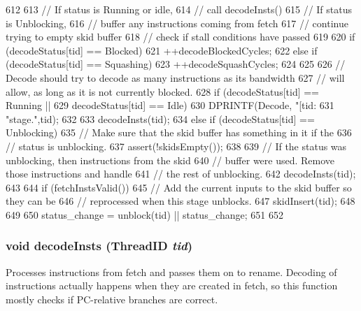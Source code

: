 \begin{DoxyCode}
612 {
613     // If status is Running or idle,
614     //     call decodeInsts()
615     // If status is Unblocking,
616     //     buffer any instructions coming from fetch
617     //     continue trying to empty skid buffer
618     //     check if stall conditions have passed
619 
620     if (decodeStatus[tid] == Blocked) {
621         ++decodeBlockedCycles;
622     } else if (decodeStatus[tid] == Squashing) {
623         ++decodeSquashCycles;
624     }
625 
626     // Decode should try to decode as many instructions as its bandwidth
627     // will allow, as long as it is not currently blocked.
628     if (decodeStatus[tid] == Running ||
629         decodeStatus[tid] == Idle) {
630         DPRINTF(Decode, "[tid:%
631                 "stage.\n",tid);
632 
633         decodeInsts(tid);
634     } else if (decodeStatus[tid] == Unblocking) {
635         // Make sure that the skid buffer has something in it if the
636         // status is unblocking.
637         assert(!skidsEmpty());
638 
639         // If the status was unblocking, then instructions from the skid
640         // buffer were used.  Remove those instructions and handle
641         // the rest of unblocking.
642         decodeInsts(tid);
643 
644         if (fetchInstsValid()) {
645             // Add the current inputs to the skid buffer so they can be
646             // reprocessed when this stage unblocks.
647             skidInsert(tid);
648         }
649 
650         status_change = unblock(tid) || status_change;
651     }
652 }
\end{DoxyCode}
\hypertarget{classDefaultDecode_a1a947755eba94aa1142e3b47068e5eee}{
\subsubsection[{decodeInsts}]{\setlength{\rightskip}{0pt plus 5cm}void decodeInsts ({\bf ThreadID} {\em tid})}}
\label{classDefaultDecode_a1a947755eba94aa1142e3b47068e5eee}
Processes instructions from fetch and passes them on to rename. Decoding of instructions actually happens when they are created in fetch, so this function mostly checks if PC-\/relative branches are correct. 


